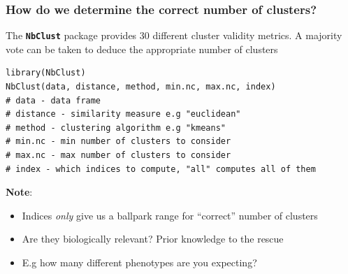 \documentclass[pdf]{beamer}
\begin{document}


\begin{frame}[fragile]
\frametitle{How do we determine the correct number of clusters?}
The \textbf{\texttt{NbClust}} package provides 30 different cluster validity metrics. A majority vote can be
taken to deduce the appropriate number of clusters
\vfill
\begin{lstlisting}[style=RCode]
library(NbClust)
NbClust(data, distance, method, min.nc, max.nc, index)
# data - data frame 
# distance - similarity measure e.g "euclidean"
# method - clustering algorithm e.g "kmeans"
# min.nc - min number of clusters to consider
# max.nc - max number of clusters to consider
# index - which indices to compute, "all" computes all of them
\end{lstlisting}
\vspace{-0.5cm}
\textbf{Note}: 
\begin{itemize}\addtolength{\itemsep}{0.3\baselineskip}
	\item Indices \textit{only} give us a ballpark range for ``correct'' number of clusters
	\item Are they biologically relevant? Prior knowledge to the rescue
	\item E.g how many different phenotypes are you expecting?
\end{itemize}
\end{frame}
\end{document}
